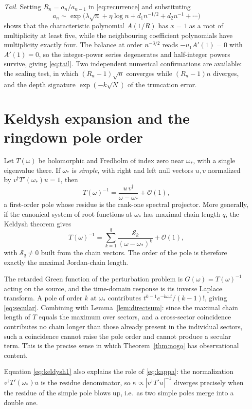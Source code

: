\documentclass[aps,prd,reprint,superscriptaddress,nofootinbib,longbibliography]{revtex4-2}
\theoremstyle{plain}
\theoremstyle{definition}
\theoremstyle{remark}
\newcommand{\ii}{\mathrm{i}}
\newcommand{\Ord}{\mathcal{O}}
\begin{document}
\emph{Tail.} Setting $R_n=a_n/a_{n-1}$ in \eqref{eq:recurrence} and substituting
\begin{equation}\label{eq:tailansatz}
  a_n\sim\exp\!\Big(\lambda\sqrt n+\eta\log n+d_1n^{-1/2}+d_2n^{-1}+\cdots\Big)
\end{equation}
shows that the characteristic polynomial $A(1/R)$ has $x=1$ as a root of
multiplicity at least five, while the neighbouring coefficient polynomials have
multiplicity exactly four. The balance at order $n^{-3/2}$ reads $-u_1A'(1)=0$
with $A'(1)=0$, so the integer-power series degenerates and half-integer powers
survive, giving \eqref{eq:tail}. Two independent numerical confirmations are
available: the scaling test, in which $(R_n-1)\sqrt n$ converges while
$(R_n-1)n$ diverges, and the depth signature $\exp(-k\sqrt N)$ of the truncation
error.

\section{Keldysh expansion and the ringdown pole order}\label{app:keldysh}

Let $T(\omega)$ be holomorphic and Fredholm of index zero near $\omega_*$, with
a single eigenvalue there. If $\omega_*$ is \emph{simple}, with right and left
null vectors $u,v$ normalized by $v^\dagger T'(\omega_*)u=1$, then
\begin{equation}\label{eq:keldysh1}
  T(\omega)^{-1}=\frac{u\,v^\dagger}{\omega-\omega_*}+\Ord(1),
\end{equation}
a first-order pole whose residue is the rank-one spectral projector. More
generally, if the canonical system of root functions at $\omega_*$ has maximal
chain length $q$, the Keldysh theorem gives
\begin{equation}\label{eq:keldyshq}
  T(\omega)^{-1}=\sum_{k=1}^{q}\frac{\mathcal{S}_k}{(\omega-\omega_*)^{k}}
  +\Ord(1),
\end{equation}
with $\mathcal{S}_q\ne0$ built from the chain vectors. The order of the pole is
therefore exactly the maximal Jordan-chain length.

The retarded Green function of the perturbation problem is
$G(\omega)=T(\omega)^{-1}$ acting on the source, and the time-domain response is
its inverse Laplace transform. A pole of order $k$ at $\omega_*$ contributes
$t^{k-1}e^{-\ii\omega_*t}/(k-1)!$, giving \eqref{eq:secular}. Combining with
Lemma~\ref{lem:directsum}: since the maximal chain length of $T$ equals the
maximum over sectors, and a cross-sector coincidence contributes no chain longer
than those already present in the individual sectors, such a coincidence cannot
raise the pole order and cannot produce a secular term. This is the precise
sense in which Theorem~\ref{thm:nogo} has observational content.

Equation \eqref{eq:keldysh1} also explains the role of \eqref{eq:kappa}: the
normalization $v^\dagger T'(\omega_*)u$ is the residue denominator, so
$\kappa\propto|v^\dagger T'u|^{-1}$ diverges precisely when the residue of the
simple pole blows up, i.e.\ as two simple poles merge into a double one.


\end{document}
